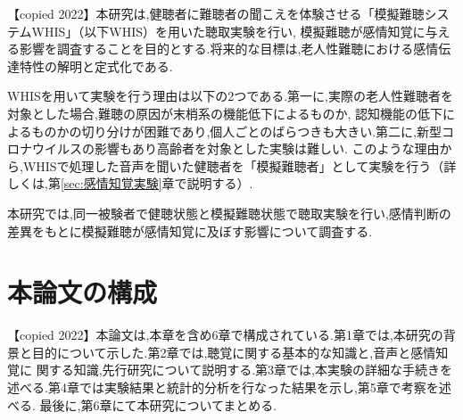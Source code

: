 
【copied 2022】本研究は,健聴者に難聴者の聞こえを体験させる「模擬難聴システムWHIS」（以下WHIS）を用いた聴取実験を行い,
模擬難聴が感情知覚に与える影響を調査することを目的とする.将来的な目標は,老人性難聴における感情伝達特性の解明と定式化である.


WHISを用いて実験を行う理由は以下の2つである.第一に,実際の老人性難聴者を対象とした場合,難聴の原因が末梢系の機能低下によるものか,
認知機能の低下によるものかの切り分けが困難であり,個人ごとのばらつきも大きい.第二に,新型コロナウイルスの影響もあり高齢者を対象とした実験は難しい.
このような理由から,WHISで処理した音声を聞いた健聴者を「模擬難聴者」として実験を行う（詳しくは,第\ref{sec:感情知覚実験}章で説明する）.

本研究では,同一被験者で健聴状態と模擬難聴状態で聴取実験を行い,感情判断の差異をもとに模擬難聴が感情知覚に及ぼす影響について調査する.

\section{本論文の構成}
\label{sec:本論文の構成}
【copied 2022】本論文は,本章を含め6章で構成されている.第1章では,本研究の背景と目的について示した.第2章では,聴覚に関する基本的な知識と,音声と感情知覚に
関する知識,先行研究について説明する.第3章では,本実験の詳細な手続きを述べる.第4章では実験結果と統計的分析を行なった結果を示し,第5章で考察を述べる.
最後に,第6章にて本研究についてまとめる.

